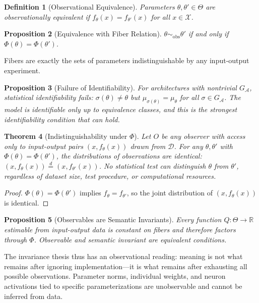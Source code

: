 \documentclass[twocolumn,10pt]{article}
\theoremstyle{thmstyle}
\newtheorem{theorem}{Theorem}[section]
\newtheorem{proposition}[theorem]{Proposition}
\theoremstyle{defstyle}
\newtheorem{definition}[theorem]{Definition}
\begin{document}
\begin{definition}[Observational Equivalence]
Parameters $\theta, \theta' \in \Theta$ are \emph{observationally
equivalent} if $f_\theta(x) = f_{\theta'}(x)$ for all $x \in \mathcal{X}$.
\end{definition}

\begin{proposition}[Equivalence with Fiber Relation]
$\theta \sim_{\mathrm{obs}} \theta'$ if and only if
$\Phi(\theta) = \Phi(\theta')$.
\end{proposition}

Fibers are exactly the sets of parameters indistinguishable by any
input-output experiment.

\begin{proposition}[Failure of Identifiability]
For architectures with nontrivial $G_\mathcal{A}$, statistical
identifiability fails: $\sigma(\theta) \neq \theta$ but
$\mu_{\sigma(\theta)} = \mu_\theta$ for all $\sigma \in G_\mathcal{A}$.
The model is identifiable only up to equivalence classes, and this is
the strongest identifiability condition that can hold.
\end{proposition}

\begin{theorem}[Indistinguishability under $\Phi$]
\label{thm:indistinguishability}
Let $O$ be any observer with access only to input-output pairs
$(x, f_\theta(x))$ drawn from $\mathcal{D}$. For any $\theta, \theta'$
with $\Phi(\theta) = \Phi(\theta')$, the distributions of observations
are identical: $(x,f_\theta(x)) \overset{d}{=} (x,f_{\theta'}(x))$.
No statistical test can distinguish $\theta$ from $\theta'$,
regardless of dataset size, test procedure, or computational resources.
\end{theorem}

\begin{proof}
$\Phi(\theta) = \Phi(\theta')$ implies $f_\theta = f_{\theta'}$, so the
joint distribution of $(x,f_\theta(x))$ is identical.
\end{proof}

\begin{proposition}[Observables are Semantic Invariants]
Every function $Q : \Theta \to \mathbb{R}$ estimable from input-output
data is constant on fibers and therefore factors through $\Phi$.
Observable and semantic invariant are equivalent conditions.
\end{proposition}

The invariance thesis thus has an observational reading: meaning is not
what remains after ignoring implementation---it is what remains after
exhausting all possible observations. Parameter norms, individual
weights, and neuron activations tied to specific parameterizations are
unobservable and cannot be inferred from data.
\end{document}
